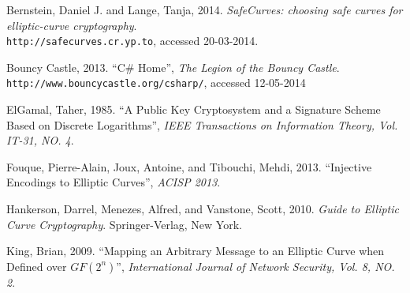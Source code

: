 \begin{thebibliography}{9}
	
		Bernstein, Daniel J. and Lange, Tanja,
        2014.
		\emph{SafeCurves: choosing safe curves for elliptic-curve cryptography}. \\
		\verb+http://safecurves.cr.yp.to+,
		accessed 20-03-2014.
        
        Bouncy Castle,
        2013.
        ``C\# Home'',
		\emph{The Legion of the Bouncy Castle}. \\
		\verb|http://www.bouncycastle.org/csharp/|,
        accessed 12-05-2014
		
	    ElGamal, Taher,
        1985.
		``A Public Key Cryptosystem and a Signature Scheme Based on Discrete Logarithms'',
		\emph{IEEE Transactions on Information Theory, Vol. IT-31, NO. 4}.
		
		Fouque, Pierre-Alain, Joux, Antoine, and Tibouchi, Mehdi,
		2013.
		``Injective Encodings to Elliptic Curves'',
		\emph{ACISP 2013}.
	
		Hankerson, Darrel, Menezes, Alfred, and Vanstone, Scott,
        2010.
		\emph{Guide to Elliptic Curve Cryptography}.
		Springer-Verlag, New York.
		
		King, Brian,
        2009.
		``Mapping an Arbitrary Message to an Elliptic Curve when Defined over \(GF(2^n)\)'',
		\emph{International Journal of Network Security, Vol. 8, NO. 2}.
	
\end{thebibliography}